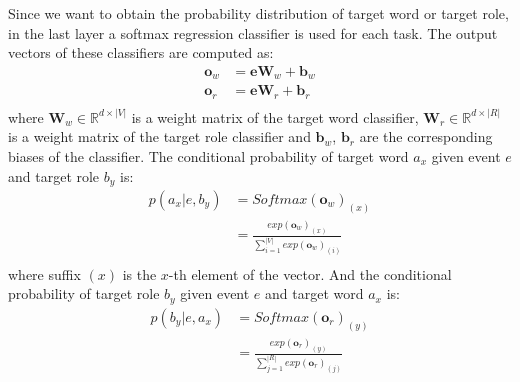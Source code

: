 \documentclass[a4paper]{article}
\begin{document}
Since we want to obtain the probability distribution of target word or target role, in the last layer a softmax regression classifier is used for each task. The output vectors of these classifiers are computed as:
\begin{equation} \label{eq:output-mt}
\begin{aligned}
    \mathbf{o}_w
        &= \mathbf{e}\mathbf{W}_w + \mathbf{b}_w \\
    \mathbf{o}_r
        &= \mathbf{e}\mathbf{W}_r + \mathbf{b}_r \\
\end{aligned}
\end{equation}
where $\mathbf{W}_w \in \mathbb{R}^{d \times |V|}$ is a weight matrix of the target word classifier,  $\mathbf{W}_r \in \mathbb{R}^{d \times |R|}$ is a weight matrix of the target role classifier and $\mathbf{b}_w$, $\mathbf{b}_r$ are the corresponding biases of the classifier. The conditional probability of target word $a_x$ given event $e$ and target role $b_y$ is:
\begin{equation} \label{eq:softmax-w}
\begin{aligned}
    p(a_x | e, b_y)
        &= Softmax(\mathbf{o}_w)_{(x)} \\
        &= \frac{
        exp(\mathbf{o}_w)_{(x)}
        }{
        \sum_{i=1}^{|V|} exp(\mathbf{o}_w)_{(i)} }   \\
\end{aligned}
\end{equation}
where suffix $(x)$ is the $x$-th element of the vector. And the conditional probability of target role $b_y$ given event $e$ and target word $a_x$ is:
\begin{equation} \label{eq:softmax-r}
\begin{aligned}
    p(b_y | e, a_x)
        &= Softmax(\mathbf{o}_r)_{(y)} \\
        &= \frac{
        exp(\mathbf{o}_r)_{(y)}
        }{
        \sum_{j=1}^{|R|} exp(\mathbf{o}_r)_{(j)} }   \\
\end{aligned}
\end{equation}
\end{document}
